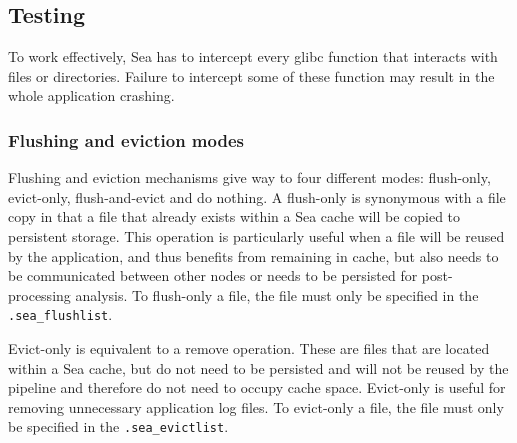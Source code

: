 


\subsection{Testing}
To work effectively, Sea has to intercept every glibc function that interacts with files or
directories. Failure to intercept some of these function may result in the whole application
crashing. 

\subsubsection{Flushing and eviction modes}
Flushing and eviction mechanisms give way to four different modes: flush-only,
evict-only, flush-and-evict and do nothing. A flush-only is synonymous with a
file copy in that a file that already exists within a Sea cache will be copied
to persistent storage. This operation is particularly useful when a file will be
reused by the application, and thus benefits from remaining in cache, but also
needs to be communicated between other nodes or needs to be persisted for
post-processing analysis. To flush-only a file, the file must only be specified
in the \texttt{.sea\_flushlist}.

Evict-only is equivalent to a remove operation. These are files that are located
within a Sea cache, but do not need to be persisted and will not be reused by
the pipeline and therefore do not need to occupy cache space. Evict-only is
useful for removing unnecessary application log files. To evict-only a file, the
file must only be specified in the \texttt{.sea\_evictlist}.

